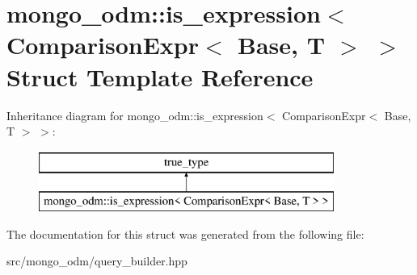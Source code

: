\hypertarget{structmongo__odm_1_1is__expression_3_01ComparisonExpr_3_01Base_00_01T_01_4_01_4}{}\section{mongo\+\_\+odm\+:\+:is\+\_\+expression$<$ Comparison\+Expr$<$ Base, T $>$ $>$ Struct Template Reference}
\label{structmongo__odm_1_1is__expression_3_01ComparisonExpr_3_01Base_00_01T_01_4_01_4}
Inheritance diagram for mongo\+\_\+odm\+:\+:is\+\_\+expression$<$ Comparison\+Expr$<$ Base, T $>$ $>$\+:\begin{figure}[H]
\begin{center}
\leavevmode
\includegraphics[height=2.000000cm]{structmongo__odm_1_1is__expression_3_01ComparisonExpr_3_01Base_00_01T_01_4_01_4}
\end{center}
\end{figure}


The documentation for this struct was generated from the following file\+:\begin{DoxyCompactItemize}
\item 
src/mongo\+\_\+odm/query\+\_\+builder.\+hpp\end{DoxyCompactItemize}
